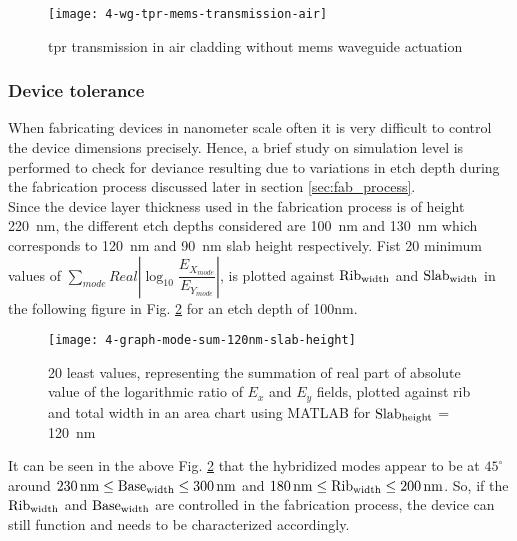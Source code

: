 \documentclass[../report.tex]{subfiles}
\begin{document}
\begin{figure}[H] %
	\centering
	\texttt{[image: 4-wg-tpr-mems-transmission-air]}
	\caption{\gls{tpr} transmission in air cladding without \gls{mems} waveguide actuation}
	\label{fig:4_wg_tpr_mems_transmission_air}
\end{figure}

\subsubsection{Device tolerance}
When fabricating devices in nanometer scale often it is very difficult to control the device dimensions precisely. Hence, a brief study on simulation level is performed to check for deviance resulting due to variations in etch depth during the fabrication process discussed later in section \ref{sec:fab_process}.\\  

Since the device layer thickness used in the fabrication process is of height \SI{220}{\nano \meter}, the different etch depths considered are \SI{100}{\nano \meter} and \SI{130}{\nano \meter} which corresponds to \SI{120}{\nano \meter} and \SI{90}{\nano \meter} slab height respectively. Fist 20 minimum values of $\sum _{mode}Real\left| \log _{10}\dfrac {E_{X_{mode}}} {E_{Y_{mode}}}\right|$, is plotted against $\mathrm{Rib_{width}}$ and $\mathrm{Slab_{width}}$ in the following figure in Fig. \ref{fig:4_graph_mode_sum_120nm_slab_height} for an etch depth of 100nm. 

\begin{figure}[H] %
	\centering
	\texttt{[image: 4-graph-mode-sum-120nm-slab-height]}
	\caption{20 least values, representing the summation of real part of absolute value of the logarithmic ratio of $E_x$ and $E_y$ fields, plotted against rib and total width in an area chart using MATLAB for $\mathrm{Slab_{height}}$ = \SI{120}{\nano \meter}}
	\label{fig:4_graph_mode_sum_120nm_slab_height}
\end{figure}
\noindent It can be seen in the above Fig. \ref{fig:4_graph_mode_sum_120nm_slab_height} that the hybridized modes appear to be at $45^{\circ}$ around $\mathrm{\SI{230}{\nano \meter} \leq Base_{width} \leq \SI{300}{\nano \meter}}$ and $\mathrm{\SI{180}{\nano \meter} \leq Rib_{width} \leq \SI{200}{\nano \meter}}$. So, if the $\mathrm{Rib_{width}}$ and $\mathrm{Base_{width}}$ are controlled in the fabrication process, the device can still function and needs to be characterized accordingly.\\
\end{document}
